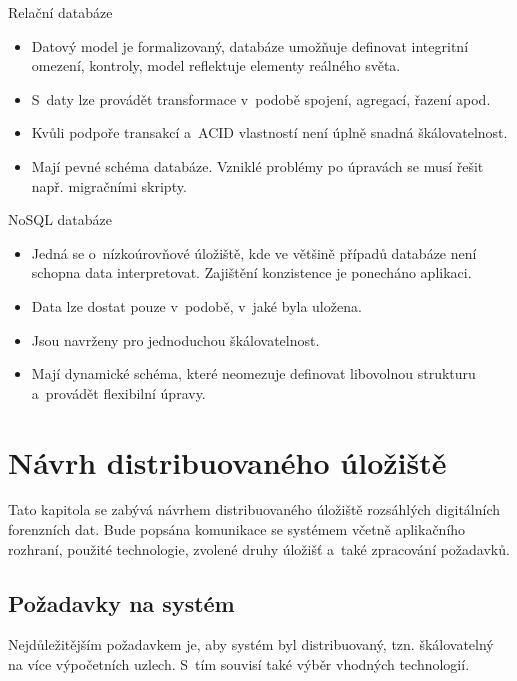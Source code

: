\begin{multicols}{2}

Relační databáze

\begin{itemize}
    \item Datový model je formalizovaný, databáze umožňuje definovat integritní omezení, kontroly, model reflektuje elementy reálného světa.
    
    \item S~daty lze provádět transformace v~podobě spojení, agregací, řazení apod.
    
    \item Kvůli podpoře transakcí a~ACID vlastností není úplně snadná škálovatelnost.
    
    \item Mají pevné schéma databáze. Vzniklé problémy po úpravách se musí řešit např. migračními skripty.
\end{itemize}

\columnbreak

NoSQL databáze

\begin{itemize}
    \item Jedná se o~nízkoúrovňové úložiště, kde ve většině případů databáze není schopna data interpretovat. Zajištění konzistence je ponecháno aplikaci. 
    
    \item Data lze dostat pouze v~podobě, v~jaké byla uložena.
    
    \item Jsou navrženy pro jednoduchou škálovatelnost.
    
    \item Mají dynamické schéma, které neomezuje definovat libovolnou strukturu a~provádět flexibilní úpravy.
\end{itemize}

\end{multicols}

\chapter{Návrh distribuovaného úložiště} \label{distrRepDesignChapter}
Tato kapitola se zabývá návrhem distribuovaného úložiště rozsáhlých digitálních forenzních dat. Bude popsána komunikace se systémem včetně aplikačního rozhraní, použité technologie, zvolené druhy úložišť a~také zpracování požadavků.

\section{Požadavky na systém}
Nejdůležitějším požadavkem je, aby systém byl distribuovaný, tzn. škálovatelný na více výpočetních uzlech. S~tím souvisí také výběr vhodných technologií.

